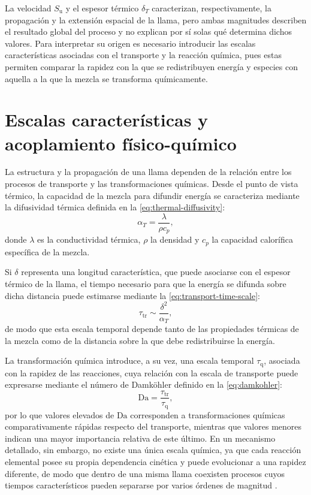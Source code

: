 \documentclass[12pt,a4paper,twoside,openany]{book}
\newcommand{\Su}{S_{\mathrm{u}}}
\begin{document}
La velocidad \(\Su\) y el espesor térmico \(\delta_T\) caracterizan,
respectivamente, la propagación y la extensión espacial de la llama, pero ambas
magnitudes describen el resultado global del proceso y no explican por sí solas
qué determina dichos valores. Para interpretar su origen es necesario introducir
las escalas características asociadas con el transporte y la reacción química,
pues estas permiten comparar la rapidez con la que se redistribuyen energía y
especies con aquella a la que la mezcla se transforma químicamente.


\section{Escalas características y acoplamiento físico-químico}
\label{sec:characteristic-scales}

La estructura y la propagación de una llama dependen de la relación entre los
procesos de transporte y las transformaciones químicas. Desde el punto de vista
térmico, la capacidad de la mezcla para difundir energía se caracteriza mediante
la difusividad térmica definida en la
\cref{eq:thermal-diffusivity}:
\begin{equation}
  \alpha_T=
  \frac{\lambda}{\rho c_p},
  \label{eq:thermal-diffusivity}
\end{equation}
donde \(\lambda\) es la conductividad térmica, \(\rho\) la densidad y \(c_p\)
la capacidad calorífica específica de la mezcla.

Si \(\delta\) representa una longitud característica, que puede asociarse con
el espesor térmico de la llama, el tiempo necesario para que la energía se
difunda sobre dicha distancia puede estimarse mediante la
\cref{eq:transport-time-scale}:
\begin{equation}
  \tau_{\mathrm{tr}}
  \sim
  \frac{\delta^2}{\alpha_T},
  \label{eq:transport-time-scale}
\end{equation}
de modo que esta escala temporal depende tanto de las propiedades térmicas de la
mezcla como de la distancia sobre la que debe redistribuirse la energía.

La transformación química introduce, a su vez, una escala temporal
\(\tau_{\mathrm q}\), asociada con la rapidez de las reacciones, cuya relación
con la escala de transporte puede expresarse mediante el número de Damköhler
definido en la \cref{eq:damkohler}:
\begin{equation}
  \mathrm{Da}
  =
  \frac{\tau_{\mathrm{tr}}}{\tau_{\mathrm q}},
  \label{eq:damkohler}
\end{equation}
por lo que valores elevados de \(\mathrm{Da}\) corresponden a transformaciones
químicas comparativamente rápidas respecto del transporte, mientras que valores
menores indican una mayor importancia relativa de este último. En un mecanismo
detallado, sin embargo, no existe una única escala química, ya que cada reacción
elemental posee su propia dependencia cinética y puede evolucionar a una rapidez
diferente, de modo que dentro de una misma llama coexisten procesos cuyos
tiempos característicos pueden separarse por varios órdenes de magnitud
\cite{Peters1984,Smooke1991}.
\end{document}

